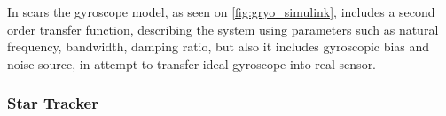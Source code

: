         

        In \ac{scars} the gyroscope model, as seen on \autoref{fig:gryo_simulink}, includes a second order transfer function, describing the system using parameters such as natural frequency, bandwidth, damping ratio, but also it includes gyroscopic bias and noise source, in attempt to transfer ideal gyroscope into real sensor. 




    \subsubsection{Star Tracker}

